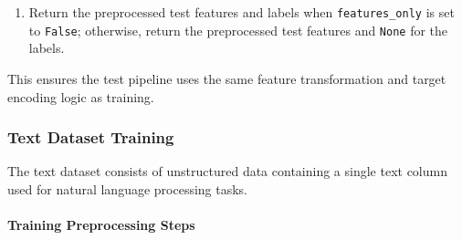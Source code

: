 \begin{enumerate}
    \begin{itemize}
      \item For classification, fill missing labels with the training-mode value, then apply the saved label encoder.
      \item For regression, fill missing values with the training median, then apply the saved standard scaler.
    \end{itemize}
\item Return the preprocessed test features and labels when \texttt{features\_only} is set to \texttt{False}; otherwise, return the preprocessed test features and \texttt{None} for the labels.
\end{enumerate}

This ensures the test pipeline uses the same feature transformation and target encoding logic as training.
\begin{table}[!htbp]
\centering

\caption{Classical Testing Data Preprocessing Parameters}
\label{tab:classicaltestingparams}

\end{table}

\subsubsection{Text Dataset Training}

The text dataset consists of unstructured data containing a single text column used for natural language processing tasks.

\vspace{1cm}
\paragraph{Training Preprocessing Steps}\par

